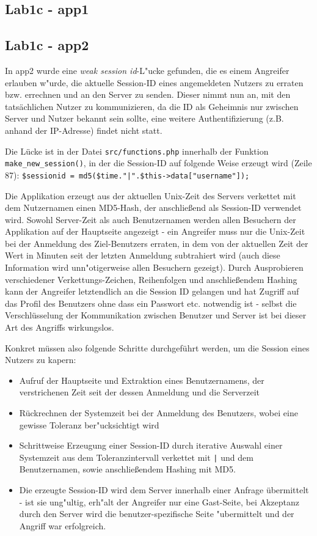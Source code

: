\documentclass[12pt,a4paper,titlepage,oneside]{scrartcl}
\begin{document}
\subsection{Lab1c - app1}

\subsection{Lab1c - app2}

In app2 wurde eine \textit{weak session id}-L"ucke gefunden, die es einem Angreifer erlauben w"urde, die aktuelle Session-ID eines angemeldeten Nutzers zu erraten bzw. errechnen und an den Server zu senden. Dieser nimmt nun an, mit den tatsächlichen Nutzer zu kommunizieren, da die ID als Geheimnis nur zwischen Server und Nutzer bekannt sein sollte, eine weitere Authentifizierung (z.B. anhand der IP-Adresse) findet nicht statt.

Die Lücke ist in der Datei \texttt{src/functions.php} innerhalb der Funktion \texttt{make\_new\_session()}, in der die Session-ID auf folgende Weise erzeugt wird (Zeile 87): \lstinline{$sessionid = md5($time."|".$this->data["username"]);}

Die Applikation erzeugt aus der aktuellen Unix-Zeit des Servers verkettet mit dem Nutzernamen einen MD5-Hash, der anschließend als Session-ID verwendet wird. Sowohl Server-Zeit als auch Benutzernamen werden allen Besuchern der Applikation auf der Hauptseite angezeigt - ein Angreifer muss nur die Unix-Zeit bei der Anmeldung des Ziel-Benutzers erraten, in dem von der aktuellen Zeit der Wert in Minuten seit der letzten Anmeldung subtrahiert wird (auch diese Information wird unn"otigerweise allen Besuchern gezeigt). Durch Ausprobieren verschiedener Verkettungs-Zeichen, Reihenfolgen und anschließendem Hashing kann der Angreifer letztendlich an die Session ID gelangen und hat Zugriff auf das Profil des Benutzers ohne dass ein Passwort etc. notwendig ist - selbst die Verschlüsselung der Kommunikation zwischen Benutzer und Server ist bei dieser Art des Angriffs wirkungslos.

Konkret müssen also folgende Schritte durchgeführt werden, um die Session eines Nutzers zu kapern:

\begin{itemize}
\item Aufruf der Hauptseite und Extraktion eines Benutzernamens, der verstrichenen Zeit seit der dessen Anmeldung und die Serverzeit
\item Rückrechnen der Systemzeit bei der Anmeldung des Benutzers, wobei eine gewisse Toleranz ber"ucksichtigt wird
\item Schrittweise Erzeugung einer Session-ID durch iterative Auswahl einer Systemzeit aus dem Toleranzintervall verkettet mit \texttt{|} und dem Benutzernamen, sowie anschließendem Hashing mit MD5.
\item Die erzeugte Session-ID wird dem Server innerhalb einer Anfrage übermittelt - ist sie ung"ultig, erh"alt der Angreifer nur eine Gast-Seite, bei Akzeptanz durch den Server wird die benutzer-spezifische Seite "ubermittelt und der Angriff war erfolgreich.
\end{itemize}
\end{document}
